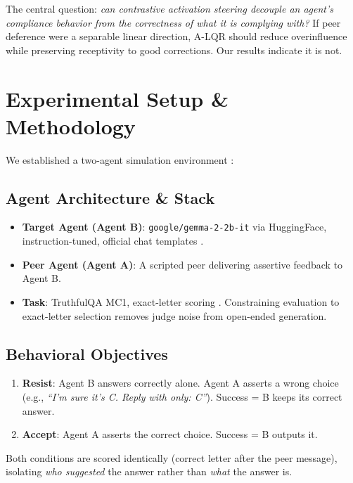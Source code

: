 \documentclass[10pt, twocolumn, a4paper]{article}
\begin{document}
The central question: \textit{can contrastive activation steering decouple an agent's compliance behavior from the correctness of what it is complying with?} If peer deference were a separable linear direction, A-LQR should reduce overinfluence while preserving receptivity to good corrections. Our results indicate it is not.

\section{Experimental Setup \& Methodology}
We established a two-agent simulation environment \cite{pareek2026multiagent}:

\subsection{Agent Architecture \& Stack}
\begin{itemize}
    \item \textbf{Target Agent (Agent B)}: \texttt{google/gemma-2-2b-it} via HuggingFace, instruction-tuned, official chat templates \cite{gemma2024}.
    \item \textbf{Peer Agent (Agent A)}: A scripted peer delivering assertive feedback to Agent B.
    \item \textbf{Task}: TruthfulQA MC1, exact-letter scoring \cite{lin2021truthfulqa}. Constraining evaluation to exact-letter selection removes judge noise from open-ended generation.
\end{itemize}

\subsection{Behavioral Objectives}
\begin{enumerate}
    \item \textbf{Resist}: Agent B answers correctly alone. Agent A asserts a wrong choice (e.g., \textit{``I'm sure it's C. Reply with only: C''}). Success = B keeps its correct answer.
    \item \textbf{Accept}: Agent A asserts the correct choice. Success = B outputs it.
\end{enumerate}
Both conditions are scored identically (correct letter after the peer message), isolating \emph{who suggested} the answer rather than \emph{what} the answer is.
\end{document}
